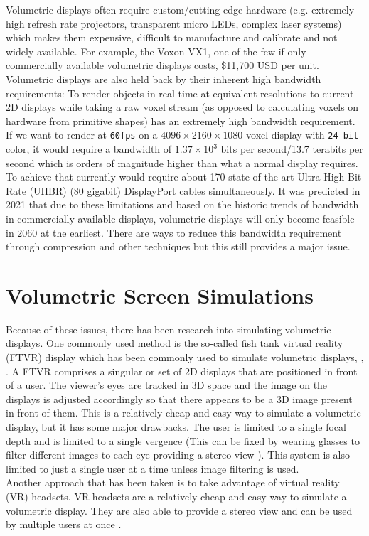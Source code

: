 Volumetric displays often require custom/cutting-edge hardware (e.g. extremely high refresh rate projectors,  transparent micro LEDs, complex laser systems) which makes them expensive, difficult to manufacture and calibrate and not widely available. For example, the Voxon VX1, one of the few if only commercially available volumetric displays costs, \$11,700 USD \cite{noauthor_products_nodate} per unit. \\

Volumetric displays are also held back by their inherent high bandwidth requirements: To render objects in real-time at equivalent resolutions to current 2D displays while taking a raw voxel stream (as opposed to calculating voxels on hardware from primitive shapes) has an extremely high bandwidth requirement. If we want to render at \texttt{60fps} on a $4096 \times 2160 \times 1080$ voxel display with \texttt{24 bit} color, it would require a bandwidth of $1.37 \times 10^3$ bits per second/13.7 terabits per second which is orders of magnitude higher than what a normal display requires. To achieve that currently would require about 170 state-of-the-art Ultra High Bit Rate (UHBR) (80 gigabit) DisplayPort cables simultaneously. It was predicted in 2021 \cite{LAM2021050011} that due to these limitations and based on the historic trends of bandwidth in commercially available displays, volumetric displays will only become feasible in 2060 at the earliest. There are ways to reduce this bandwidth requirement through compression and other techniques \cite{4487481} but this still provides a major issue. \\

\section{Volumetric Screen Simulations}
Because of these issues, there has been research into simulating volumetric displays. One commonly used method is the so-called fish tank virtual reality (FTVR) display \cite{10.1145/169059.169066} which has been commonly used to simulate volumetric displays, \cite{10.1145/3281505.3281540}, \cite{Zabarauskas2012}. A FTVR comprises a singular or set of 2D displays that are positioned in front of a user. The viewer's eyes are tracked in 3D space and the image on the displays is adjusted accordingly so that there appears to be a 3D image present in front of them. This is a relatively cheap and easy way to simulate a volumetric display, but it has some major drawbacks. The user is limited to a single focal depth and is limited to a single vergence (This can be fixed by wearing glasses to filter different images to each eye providing a stereo view \cite{5701756}). This system is also limited to just a single user at a time unless image filtering is used. \\

Another approach that has been taken is to take advantage of virtual reality (VR) headsets. VR headsets are a relatively cheap and easy way to simulate a volumetric display. They are also able to provide a stereo view and can be used by multiple users at once \cite{10.1145/3290605.3300763}.